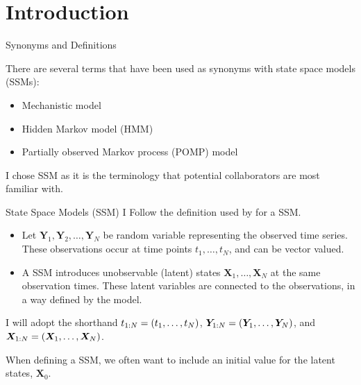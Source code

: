 \documentclass[aspectratio=169]{beamer}\usepackage[]{graphicx}\usepackage[]{xcolor}
\begin{document}
\section{Introduction}

\begin{frame}{Synonyms and Definitions}

There are several terms that have been used as synonyms with state space models (SSMs):

\begin{itemize}
  \item Mechanistic model
  \item Hidden Markov model (HMM)
  \item Partially observed Markov process (POMP) model
\end{itemize}

I chose SSM as it is the terminology that potential collaborators are most familiar with.
\end{frame}

\begin{frame}{State Space Models (SSM)}
  I Follow the definition used by \citet{durbin12} for a SSM.
  
  \begin{itemize}
  \item Let $\bm{Y}_{1}, \bm{Y}_2, \ldots, \bm{Y}_{N}$ be random variable representing the observed time series. These observations occur at time points $t_1, \ldots, t_N$, and can be vector valued. 
  \item A SSM introduces unobservable (latent) states $\bm{X}_1, \ldots, \bm{X}_N$ at the same observation times. These latent variables are connected to the observations, in a way defined by the model.
  \end{itemize}
  
  I will adopt the shorthand $t_{{1}:{N}} = (t_1, \ldots, t_N)$, $\bm{Y}_{{1}:{N}} = (\bm{Y}_{1}, \ldots, \bm{Y}_{N})$, and $\bm{X}_{{1}:{N}} = (\bm{X}_1, \ldots, \bm{X}_N)$.
  
  When defining a SSM, we often want to include an initial value for the latent states, $\bm{X}_0$.

\end{frame}
\end{document}
